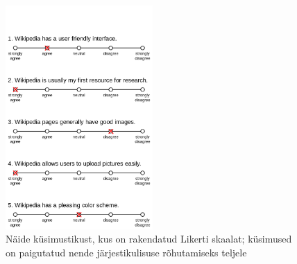 \documentclass[a4paper,12pt]{article}
\numberwithin{equation}{section}
\theoremstyle{definition}
\begin{document}
\begin{figure}[H]
\centering
\includegraphics[width=0.5\textwidth, height = 0.7\textwidth]{Example_Likert_Scale.png}
\caption{Näide k\"usimustikust, kus on rakendatud Likerti skaalat; k\"usimused on paigutatud nende järjestikulisuse rõhutamiseks teljele\cite{Smith}}
\label{likert2}
\end{figure}



\pagebreak
{}

\end{document}
